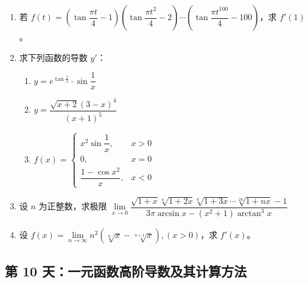 \begin{enumerate}[label=\textbf{\arabic*.}, itemsep=4.5cm]
    \item 若 $f(t) = \left( \tan \dfrac{\pi t}{4} - 1 \right) \left( \tan \dfrac{\pi t^2}{4} - 2 \right) \cdots \left( \tan \dfrac{\pi t^{100}}{4} - 100 \right)$，求 $f'(1)$。

\vspace{10em}

    \item 求下列函数的导数 $y'$：
    \begin{enumerate}[label=(\arabic*),itemsep=3cm]
        \item $y = e^{\tan \frac{1}{x}} \cdot \sin \dfrac{1}{x}$
        \item $y = \dfrac{\sqrt{x+2} (3-x)^4}{(x+1)^5}$
        \item $f(x) = \begin{cases} x^2 \sin \dfrac{1}{x}, & x > 0 \\ 0, & x = 0 \\ \dfrac{1 - \cos x^2}{x}, & x < 0 \end{cases}$
    \end{enumerate}

    \item 设 $n$ 为正整数，求极限
    $\lim\limits_{x \to 0} \dfrac{\sqrt{1+x} \sqrt[4]{1+2x} \sqrt[6]{1+3x} \cdots \sqrt[2n]{1+nx} - 1}{3\pi \arcsin x - (x^2 + 1)\arctan^3 x}$

    \item 设 $f(x) = \lim\limits_{n \to \infty} n^2 (\sqrt[n]{x} - \sqrt[n+1]{x}), (x > 0)$，求 $f'(x)$。
\end{enumerate}

\newpage
\subsection*{第 10 天：一元函数高阶导数及其计算方法}

